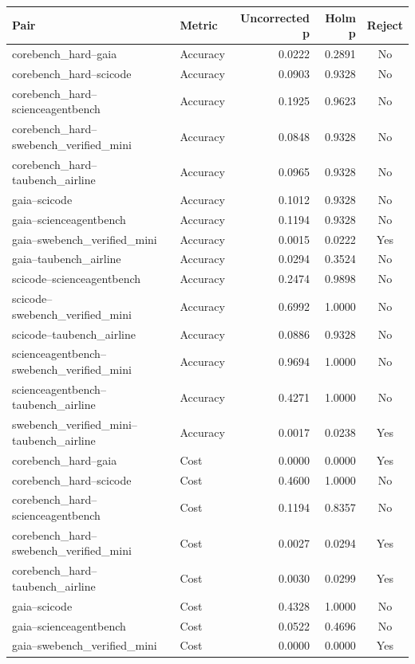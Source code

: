 \begin{tabular}{llrrc}
\toprule
Pair & Metric & Uncorrected p & Holm p & Reject \\
\midrule
corebench\_hard--gaia & Accuracy & 0.0222 & 0.2891 & No \\
corebench\_hard--scicode & Accuracy & 0.0903 & 0.9328 & No \\
corebench\_hard--scienceagentbench & Accuracy & 0.1925 & 0.9623 & No \\
corebench\_hard--swebench\_verified\_mini & Accuracy & 0.0848 & 0.9328 & No \\
corebench\_hard--taubench\_airline & Accuracy & 0.0965 & 0.9328 & No \\
gaia--scicode & Accuracy & 0.1012 & 0.9328 & No \\
gaia--scienceagentbench & Accuracy & 0.1194 & 0.9328 & No \\
gaia--swebench\_verified\_mini & Accuracy & 0.0015 & 0.0222 & Yes \\
gaia--taubench\_airline & Accuracy & 0.0294 & 0.3524 & No \\
scicode--scienceagentbench & Accuracy & 0.2474 & 0.9898 & No \\
scicode--swebench\_verified\_mini & Accuracy & 0.6992 & 1.0000 & No \\
scicode--taubench\_airline & Accuracy & 0.0886 & 0.9328 & No \\
scienceagentbench--swebench\_verified\_mini & Accuracy & 0.9694 & 1.0000 & No \\
scienceagentbench--taubench\_airline & Accuracy & 0.4271 & 1.0000 & No \\
swebench\_verified\_mini--taubench\_airline & Accuracy & 0.0017 & 0.0238 & Yes \\
corebench\_hard--gaia & Cost & 0.0000 & 0.0000 & Yes \\
corebench\_hard--scicode & Cost & 0.4600 & 1.0000 & No \\
corebench\_hard--scienceagentbench & Cost & 0.1194 & 0.8357 & No \\
corebench\_hard--swebench\_verified\_mini & Cost & 0.0027 & 0.0294 & Yes \\
corebench\_hard--taubench\_airline & Cost & 0.0030 & 0.0299 & Yes \\
gaia--scicode & Cost & 0.4328 & 1.0000 & No \\
gaia--scienceagentbench & Cost & 0.0522 & 0.4696 & No \\
gaia--swebench\_verified\_mini & Cost & 0.0000 & 0.0000 & Yes \\

\end{tabular}
